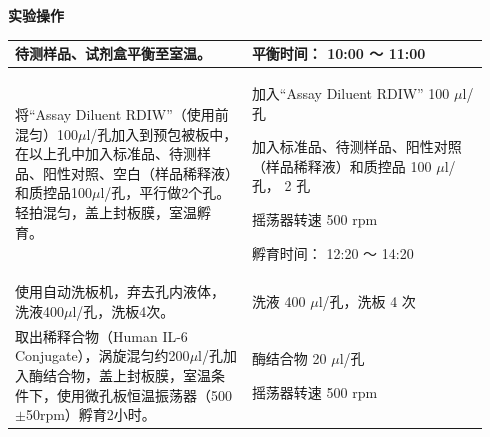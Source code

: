 \documentclass[UTF8,10pt,a4paper,fontset=fandol]{ctexart}
\newcommand{\fieldvalue}[1]{#1}
\newcommand{\handwritten}[1]{#1}
\begin{document}
\vspace{0.5em}

\begin{center}
\textbf{实验操作}
\end{center}

\small
\begin{tabular}{|p{0.47\linewidth}|p{0.47\linewidth}|}
\hline
待测样品、试剂盒平衡至室温。 &
平衡时间：
\fieldvalue{\handwritten{10:00 ～ 11:00}} \\
\hline
将“Assay Diluent RDIW”（使用前混匀）100$\mu$l/孔加入到预包被板中，在以上孔中加入标准品、待测样品、阳性对照、空白（样品稀释液）和质控品100$\mu$l/孔，平行做2个孔。轻拍混匀，盖上封板膜，室温孵育。 &
加入“Assay Diluent RDIW”
\fieldvalue{\handwritten{100}} $\mu$l/孔

\vspace{0.2em}
加入标准品、待测样品、阳性对照（样品稀释液）和质控品
\fieldvalue{\handwritten{100}} $\mu$l/孔，
\fieldvalue{\handwritten{2}} 孔

\vspace{0.2em}
摇荡器转速
\fieldvalue{\handwritten{500}} rpm

\vspace{0.2em}
孵育时间：
\fieldvalue{\handwritten{12:20 ～ 14:20}} \\
\hline
使用自动洗板机，弃去孔内液体，洗液400$\mu$l/孔，洗板4次。 &
洗液
\fieldvalue{\handwritten{400}} $\mu$l/孔，洗板
\fieldvalue{\handwritten{4}} 次 \\
\hline
取出稀释合物（Human IL-6 Conjugate），涡旋混匀约200$\mu$l/孔加入酶结合物，盖上封板膜，室温条件下，使用微孔板恒温振荡器（500$\pm$50rpm）孵育2小时。 &
酶结合物
\fieldvalue{\handwritten{20}} $\mu$l/孔

\vspace{0.2em}
摇荡器转速
\fieldvalue{\handwritten{500}} rpm


\end{tabular}
\end{document}
